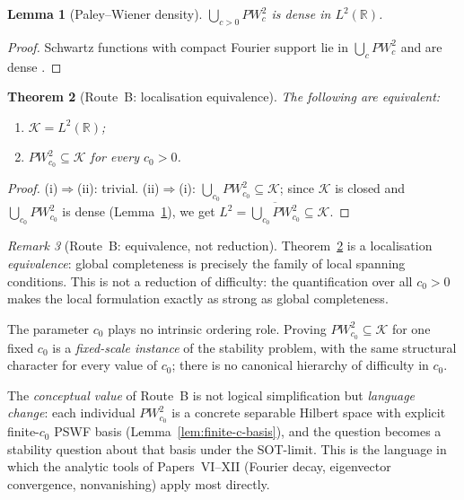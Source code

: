 \documentclass[12pt,a4paper]{amsart}
\newtheorem{theorem}{Theorem}[section]
\newtheorem{lemma}[theorem]{Lemma}
\theoremstyle{definition}
\theoremstyle{remark}
\newtheorem{remark}[theorem]{Remark}
\newcommand{\PW}{PW}
\newcommand{\Kspace}{\mathcal{K}}
\begin{document}
\begin{lemma}[Paley--Wiener density]
\label{lem:pw-dense}
$\bigcup_{c>0}\PW_c^2$ is dense in $L^2(\mathbb{R})$.
\end{lemma}
\begin{proof}
Schwartz functions with compact Fourier support lie
in $\bigcup_c\PW_c^2$ and are dense
\cite[Thm.~7.14]{Rudin1991}.\end{proof}

\begin{theorem}[Route~B: localisation equivalence]
\label{thm:H2-equiv}
The following are equivalent:
\begin{enumerate}[\rm(i)]
\item $\Kspace = L^2(\mathbb{R})$;
\item $\PW_{c_0}^2 \subseteq \Kspace$ for every $c_0 > 0$.
\end{enumerate}
\end{theorem}
\begin{proof}
(i)$\Rightarrow$(ii): trivial.
(ii)$\Rightarrow$(i): $\bigcup_{c_0}\PW_{c_0}^2
\subseteq\Kspace$;
since $\Kspace$ is closed and
$\bigcup_{c_0}\PW_{c_0}^2$ is dense
(Lemma~\ref{lem:pw-dense}),
we get $L^2=\overline{\bigcup_{c_0}\PW_{c_0}^2}
\subseteq\Kspace$.
\end{proof}

\begin{remark}[Route~B: equivalence, not reduction]
\label{rem:routeB-equiv}
Theorem~\ref{thm:H2-equiv} is a localisation
\emph{equivalence}: global completeness is precisely
the family of local spanning conditions.
This is not a reduction of difficulty:
the quantification over all $c_0 > 0$ makes the
local formulation exactly as strong as global completeness.

The parameter $c_0$ plays no intrinsic ordering role.
Proving $\PW_{c_0}^2 \subseteq \Kspace$ for one
fixed $c_0$ is a \emph{fixed-scale instance}
of the stability problem, with the same structural
character for every value of $c_0$;
there is no canonical hierarchy of difficulty in $c_0$.

The \emph{conceptual value} of Route~B is not logical
simplification but \emph{language change}:
each individual $\PW_{c_0}^2$ is a concrete
separable Hilbert space with explicit finite-$c_0$
PSWF basis (Lemma~\ref{lem:finite-c-basis}),
and the question becomes a stability question
about that basis under the SOT-limit.
This is the language in which the analytic
tools of Papers~VI--XII (Fourier decay, eigenvector
convergence, nonvanishing) apply most directly.
\end{remark}
\end{document}
